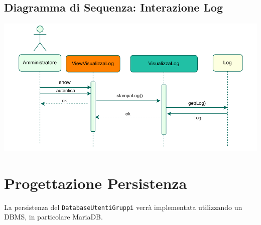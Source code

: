 \subsection*{Diagramma di Sequenza: Interazione Log}
{}
\vspace{1.5cm}
\begin{adjustwidth}{0cm}{0cm}
\includegraphics[scale=1]{progettazione/Diagramma-Sequenza-Interazione-Log.drawio.pdf}
\end{adjustwidth}
\vspace{0.5cm}




\pagebreak
\section*{Progettazione Persistenza}
{}
\vspace{1cm}
La persistenza del \verb|DatabaseUtentiGruppi| verrà implementata utilizzando un DBMS, in particolare MariaDB.
\vspace{0.5cm}
